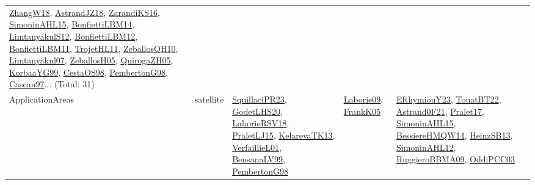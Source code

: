 {\begin{longtable}{lp{3cm}>{\raggedright}p{6cm}>{\raggedright}p{6cm}p{8cm}}
\href{articles/ZhangW18.pdf}{ZhangW18}\cite{ZhangW18}, \href{papers/AstrandJZ18.pdf}{AstrandJZ18}\cite{AstrandJZ18}, \href{articles/ZarandiKS16.pdf}{ZarandiKS16}\cite{ZarandiKS16}, \href{articles/SimoninAHL15.pdf}{SimoninAHL15}\cite{SimoninAHL15}, \href{articles/BonfiettiLBM14.pdf}{BonfiettiLBM14}\cite{BonfiettiLBM14}, \href{articles/LimtanyakulS12.pdf}{LimtanyakulS12}\cite{LimtanyakulS12}, \href{papers/BonfiettiLBM12.pdf}{BonfiettiLBM12}\cite{BonfiettiLBM12}, \href{papers/BonfiettiLBM11.pdf}{BonfiettiLBM11}\cite{BonfiettiLBM11}, \href{articles/TrojetHL11.pdf}{TrojetHL11}\cite{TrojetHL11}, \href{articles/ZeballosQH10.pdf}{ZeballosQH10}\cite{ZeballosQH10}, \href{papers/Limtanyakul07.pdf}{Limtanyakul07}\cite{Limtanyakul07}, \href{articles/ZeballosH05.pdf}{ZeballosH05}\cite{ZeballosH05}, \href{papers/QuirogaZH05.pdf}{QuirogaZH05}\cite{QuirogaZH05}, \href{papers/KorbaaYG99.pdf}{KorbaaYG99}\cite{KorbaaYG99}, \href{papers/CestaOS98.pdf}{CestaOS98}\cite{CestaOS98}, \href{papers/PembertonG98.pdf}{PembertonG98}\cite{PembertonG98}, \href{papers/Caseau97.pdf}{Caseau97}\cite{Caseau97}... (Total: 31)\\
ApplicationAreas & satellite & \href{papers/SquillaciPR23.pdf}{SquillaciPR23}\cite{SquillaciPR23}, \href{papers/GodetLHS20.pdf}{GodetLHS20}\cite{GodetLHS20}, \href{articles/LaborieRSV18.pdf}{LaborieRSV18}\cite{LaborieRSV18}, \href{papers/PraletLJ15.pdf}{PraletLJ15}\cite{PraletLJ15}, \href{papers/KelarevaTK13.pdf}{KelarevaTK13}\cite{KelarevaTK13}, \href{papers/VerfaillieL01.pdf}{VerfaillieL01}\cite{VerfaillieL01}, \href{articles/BensanaLV99.pdf}{BensanaLV99}\cite{BensanaLV99}, \href{papers/PembertonG98.pdf}{PembertonG98}\cite{PembertonG98} & \href{papers/Laborie09.pdf}{Laborie09}\cite{Laborie09}, \href{papers/FrankK05.pdf}{FrankK05}\cite{FrankK05} & \href{papers/EfthymiouY23.pdf}{EfthymiouY23}\cite{EfthymiouY23}, \href{papers/TouatBT22.pdf}{TouatBT22}\cite{TouatBT22}, \href{papers/Astrand0F21.pdf}{Astrand0F21}\cite{Astrand0F21}, \href{papers/Pralet17.pdf}{Pralet17}\cite{Pralet17}, \href{articles/SimoninAHL15.pdf}{SimoninAHL15}\cite{SimoninAHL15}, \href{papers/BessiereHMQW14.pdf}{BessiereHMQW14}\cite{BessiereHMQW14}, \href{articles/HeinzSB13.pdf}{HeinzSB13}\cite{HeinzSB13}, \href{papers/SimoninAHL12.pdf}{SimoninAHL12}\cite{SimoninAHL12}, \href{articles/RuggieroBBMA09.pdf}{RuggieroBBMA09}\cite{RuggieroBBMA09}, \href{papers/OddiPCC03.pdf}{OddiPCC03}\cite{OddiPCC03}\\

\end{longtable}}
